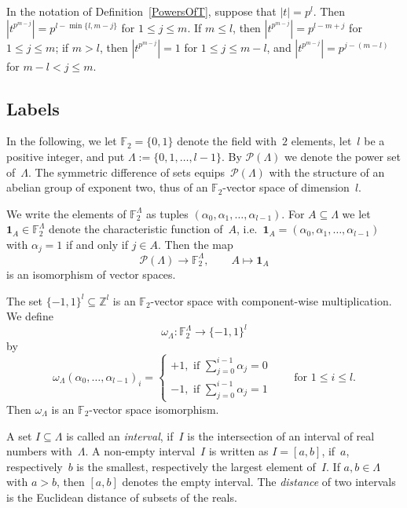 \documentclass[12pt]{amsart}
\theoremstyle{theorem}
\theoremstyle{definition}
\theoremstyle{remark}
\begin{document}
In the notation of Definition~\ref{PowersOfT}, suppose that $|t| = p^l$. Then 
$|t^{p^{m-j}}| = p^{l - \min\{ l, m - j \}}$ for
$1 \leq j \leq m$. If $m \leq l$, then $|t^{p^{m-j}}| = p^{l-m+j}$ for 
$1 \leq j \leq m$; if $m > l$, then $|t^{p^{m-j}}| = 1$ for 
$1 \leq j \leq m - l$, and $|t^{p^{m-j}}| = p^{j - (m - l)}$ for 
$m -l < j \leq m$.

\subsection{Labels}
\label{Labels}
In the following, we let $\mathbb{F}_2 = \{ 0, 1 \}$ denote the field with~$2$
elements, let~$l$ be a positive integer, and put $\Lambda := \{ 0, 1, \ldots , l - 1 \}$. 
By $\mathcal{P}(\Lambda)$ we denote the power set of~$\Lambda$. The symmetric 
difference of sets equips~$\mathcal{P}(\Lambda)$ with the structure of an 
abelian group of exponent two, thus of an $\mathbb{F}_2$-vector space of 
dimension~$l$.

We write the elements of $\mathbb{F}_2^{\Lambda}$ as tuples 
$(\alpha_0, \alpha_1, \ldots, \alpha_{l-1} )$. For 
$A \subseteq \Lambda$ we let $\mathbf{1}_A \in \mathbb{F}_2^\Lambda$ denote the 
characteristic function of~$A$, i.e.\ $\mathbf{1}_A = 
(\alpha_0, \alpha_1, \ldots, \alpha_{l-1} )$ with $\alpha_j = 1$ if and only if 
$j \in A$. Then the map
\begin{equation}
\label{CharacteristicFunction}
\mathcal{P}(\Lambda) \rightarrow \mathbb{F}_2^{\Lambda},\quad\quad A \mapsto \mathbf{1}_A
\end{equation}
is an isomorphism of vector spaces.

The set $\{ -1, 1 \}^l \subseteq \mathbb{Z}^l$ is an $\mathbb{F}_2$-vector space
with component-wise multiplication. We define 
\begin{equation}
\label{DefineOmega}
\omega_{\Lambda}: \mathbb{F}_2^{\Lambda} \rightarrow \{ -1, 1 \}^l
\end{equation}
by 
$$\omega_{\Lambda}(\alpha_0, \ldots , \alpha_{l-1})_i = 
\begin{cases} 
+1, \text{\ if\ } \sum_{j = 0}^{i-1} \alpha_j = 0\\
-1, \text{\ if\ } \sum_{j = 0}^{i-1} \alpha_j = 1
\end{cases}\quad\quad\text{for\ } 1 \leq i \leq l.
$$
Then $\omega_{\Lambda}$ is an $\mathbb{F}_2$-vector space isomorphism.

A set $I \subseteq \Lambda$ is called an \textit{interval}, if~$I$ is the 
intersection of an interval of real numbers with~$\Lambda$. A non-empty 
interval~$I$ is written as $I = [a,b]$, if~$a$, respectively~$b$ is the smallest, 
respectively the largest element of~$I$. If $a, b \in \Lambda$ with $a > b$, 
then $[a,b]$ denotes the empty interval. The \textit{distance} of two
intervals is the Euclidean distance of subsets of the reals.
\end{document}
